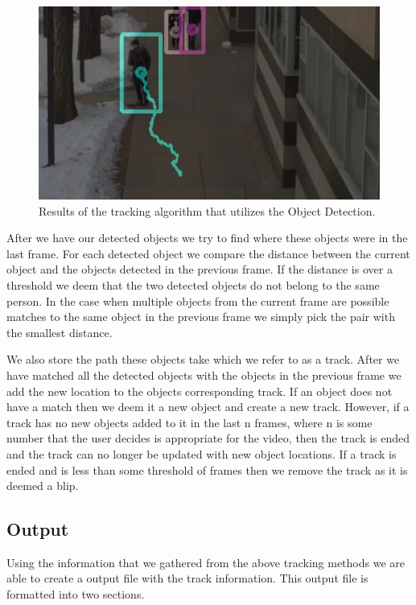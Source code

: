 \documentclass[12pt, onecolumn, conference]{IEEEtran}
\begin{document}
\begin{figure}[!t]
\centering
\includegraphics[height=2.5in]{Screenshots/OB_Tracking.png}
\caption{Results of the tracking algorithm that utilizes the Object Detection.}
\label{Tracking_Object_Detection}
\end{figure}

After we have our detected objects we try to find where these objects were in the last frame. For each detected object we compare the distance between the current object and the objects detected in the previous frame. If the distance is over a threshold we deem that the two detected objects do not belong to the same person. In the case when multiple objects from the current frame are possible matches to the same object in the previous frame we simply pick the pair with the smallest distance.

We also store the path these objects take which we refer to as a track. After we have matched all the detected objects with the objects in the previous frame we add the new location to the objects corresponding track. If an object does not have a match then we deem it a new object and create a new track. However, if a track has no new objects added to it in the last n frames, where n is some number that the user decides is appropriate for the video, then the track is ended and the track can no longer be updated with new object locations. If a track is ended and is less than some threshold of frames then we remove the track as it is deemed a blip.

\subsection{Output}

Using the information that we gathered from the above tracking methods we are able to create a output file with the track information. This output file is formatted into two sections.
\end{document}
